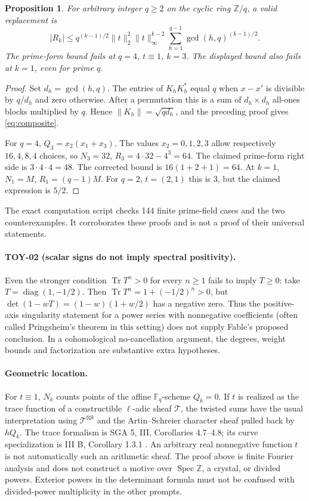 \documentclass[11pt,a4paper]{article}
\newcommand{\Tr}{\operatorname{Tr}}
\newcommand{\Spec}{\operatorname{Spec}}
\newcommand{\diag}{\operatorname{diag}}
\newcommand{\Z}{\mathbb Z}
\newcommand{\F}{\mathbb F}
\newtheorem*{proposition}{Proposition}
\begin{document}
\begin{proposition}
For arbitrary integer $q\ge2$ on the cyclic ring $\Z/q$, a valid replacement is
\begin{equation}\label{eq:composite}
 |R_k|\le q^{(k-1)/2}\|t\|_2^2\|t\|_\infty^{k-2}
 \sum_{h=1}^{q-1}\gcd(h,q)^{(k-1)/2}.
\end{equation}
The prime-form bound fails at $q=4$, $t\equiv1$, $k=3$. The displayed bound also fails at $k=1$, even for prime $q$.
\end{proposition}
\begin{proof}
Set $d_h=\gcd(h,q)$. The entries of $K_hK_h^*$ equal $q$ when $x-x'$ is divisible by $q/d_h$ and zero otherwise. After a permutation this is a sum of $d_h\times d_h$ all-ones blocks multiplied by $q$. Hence $\|K_h\|=\sqrt{qd_h}$, and the preceding proof gives \eqref{eq:composite}.

For $q=4$, $Q_3=x_2(x_1+x_3)$. The values $x_2=0,1,2,3$ allow respectively $16,4,8,4$ choices, so $N_3=32$, $R_3=4\cdot32-4^3=64$. The claimed prime-form right side is $3\cdot4\cdot4=48$. The corrected bound is $16(1+2+1)=64$. At $k=1$, $N_1=M$, $R_1=(q-1)M$. For $q=2$, $t=(2,1)$ this is $3$, but the claimed expression is $5/2$.
\end{proof}
The exact computation script checks 144 finite prime-field cases and the two counterexamples. It corroborates these proofs and is not a proof of their universal statements.

\paragraph{TOY-02 (scalar signs do not imply spectral positivity).}
Even the stronger condition $\Tr T^n>0$ for every $n\ge1$ fails to imply $T\ge0$: take $T=\diag(1,-1/2)$. Then $\Tr T^n=1+(-1/2)^n>0$, but $\det(1-wT)=(1-w)(1+w/2)$ has a negative zero. Thus the positive-axis singularity statement for a power series with nonnegative coefficients (often called Pringsheim's theorem in this setting) does not supply Fable's proposed conclusion. In a cohomological no-cancellation argument, the degrees, weight bounds and factorization are substantive extra hypotheses.

\paragraph{Geometric location.}
For $t\equiv1$, $N_k$ counts points of the affine $\F_q$-scheme $Q_k=0$. If $t$ is realized as the trace function of a constructible $\ell$-adic sheaf $\mathcal T$, the twisted sums have the usual interpretation using $\mathcal T^{\boxtimes k}$ and the Artin--Schreier character sheaf pulled back by $hQ_k$. The trace formalism is SGA 5, III, Corollaries 4.7--4.8; its curve specialization is III B, Corollary 1.3.1 \cite{sga5}. An arbitrary real nonnegative function $t$ is not automatically such an arithmetic sheaf. The proof above is finite Fourier analysis and does not construct a motive over $\Spec\Z$, a crystal, or divided powers. Exterior powers in the determinant formula must not be confused with divided-power multiplicity in the other prompts.
\end{document}
